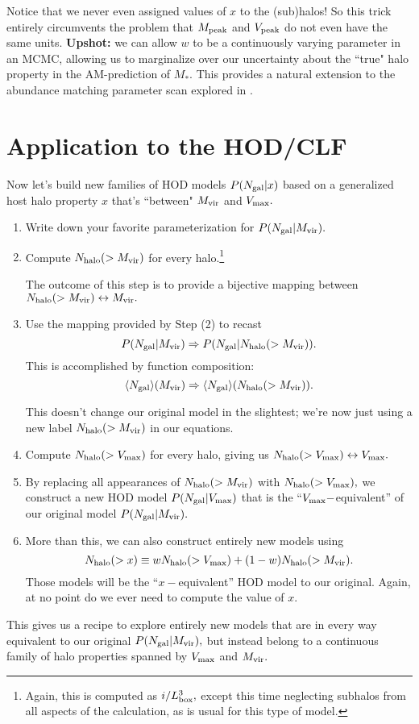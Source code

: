 \documentclass[usenatbib,usegraphicx,letterpaper]{mn2e}
\newcommand{\vmax}{V_{\rm max}}
\newcommand{\mvir}{M_{\rm vir}}
\newcommand{\mpeak}{M_{\rm peak}}
\newcommand{\vpeak}{V_{\rm peak}}
\newcommand{\ben}{\begin{enumerate}}
\newcommand{\een}{\end{enumerate}}
\newcommand{\Ngal}{N_{\rm gal}}
\newcommand{\Nhalo}{N_{\rm halo}}
\newcommand{\mstar}{M_{\ast}}
\begin{document}
Notice that we never even assigned values of $x$ to the (sub)halos! So this trick entirely circumvents the problem that $\mpeak$ and $\vpeak$ do not even have the same units. {\bf Upshot:} we can allow $w$ to be a continuously varying parameter in an MCMC, allowing us to  marginalize over our uncertainty about the ``true" halo property in the AM-prediction of $\mstar.$ This provides a natural extension to the abundance matching parameter scan explored in \citet{reddick_etal12}. 


\section{Application to the HOD/CLF}
\label{sec:hodclf}

Now let's build new families of HOD models $P(\Ngal|x)$ based on a generalized host halo property $x$ that's ``between" $\mvir$ and $\vmax.$ 

\ben
\item Write down your favorite parameterization for $P(\Ngal | \mvir).$
\item Compute $\Nhalo(>\mvir)$ for every halo.\footnote{Again, this is computed as $i/L_{\rm box}^{3},$ except this time neglecting subhalos from all aspects of the calculation, as is usual for this type of model.} 

The outcome of this step is to provide a bijective mapping between $\Nhalo(>\mvir)\leftrightarrow\mvir.$ 
\item Use the mapping provided by Step (2) to recast $$P(\Ngal | \mvir)\Rightarrow P(\Ngal |\Nhalo(>\mvir)).$$
This is accomplished by function composition: $$\langle\Ngal\rangle(\mvir)\Rightarrow\langle\Ngal\rangle(\Nhalo(>\mvir)).$$

This doesn't change our original model in the slightest; we're now just using a new label $\Nhalo(>\mvir)$ in our equations.
\item Compute $\Nhalo(>\vmax)$ for every halo, giving us $\Nhalo(>\vmax)\leftrightarrow\vmax.$ 
\item By replacing all appearances of $\Nhalo(>\mvir)$ with $\Nhalo(>\vmax),$ 
we construct a new HOD model $P(\Ngal|\vmax)$ that is the ``$\vmax-$equivalent'' of our original model $P(\Ngal | \mvir).$
\item More than this, we can also construct entirely new models using $$\Nhalo(>x) \equiv w\Nhalo(>\vmax) + (1-w)\Nhalo(>\mvir).$$ 
Those models will be the ``$x-$equivalent'' HOD model to our original. Again, at no point do we ever need to compute the value of $x.$
\een

This gives us a recipe to explore entirely new models that are in every way equivalent to our original $P(\Ngal | \mvir),$ but instead belong to a continuous family of halo properties spanned by $\vmax$ and $\mvir.$





\end{document}
